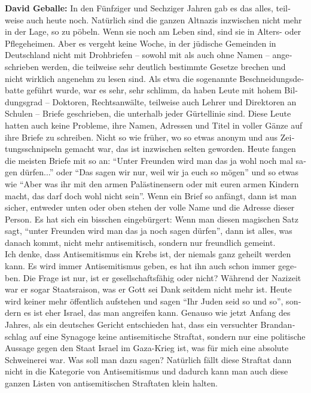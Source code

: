 \begin{otherlanguage}{ngerman}
\textbf{David Geballe:} In den Fünfziger und Sechziger Jahren gab es das alles, teilweise auch heute noch. Natürlich sind die ganzen Altnazis inzwischen nicht mehr in der Lage, so zu pöbeln. Wenn sie noch am Leben sind, sind sie in Alters- oder Pflegeheimen. Aber es vergeht keine Woche, in der jüdische Gemeinden in Deutschland nicht mit Drohbriefen – sowohl mit als auch ohne Namen – angeschrieben werden, die teilweise sehr deutlich bestimmte Gesetze brechen und nicht wirklich angenehm zu lesen sind. Als etwa die sogenannte Beschneidungsdebatte geführt wurde, war es sehr, sehr schlimm, da haben Leute mit hohem Bildungsgrad – Doktoren, Rechtsanwälte, teilweise auch Lehrer und Direktoren an Schulen – Briefe geschrieben, die unterhalb jeder Gürtellinie sind. Diese Leute hatten auch keine Probleme, ihre Namen, Adressen und Titel in voller Gänze auf ihre Briefe zu schreiben. Nicht so wie früher, wo so etwas anonym und aus Zeitungsschnipseln gemacht war, das ist inzwischen selten geworden. Heute fangen die meisten Briefe mit so an: "`Unter Freunden wird man das ja wohl noch mal sagen dürfen..."' oder "`Das sagen wir nur, weil wir ja euch so mögen"' und so etwas wie "`Aber was ihr mit den armen Palästinensern oder mit euren armen Kindern macht, das darf doch wohl nicht sein"'. Wenn ein Brief so anfängt, dann ist man sicher, entweder unten oder oben stehen der volle Name und die Adresse dieser Person. Es hat sich ein bisschen eingebürgert: Wenn man diesen magischen Satz sagt, "`unter Freunden wird man das ja noch sagen dürfen"', dann ist alles, was danach kommt, nicht mehr antisemitisch, sondern nur freundlich gemeint.\\ 
Ich denke, dass Antisemitismus ein Krebs ist, der niemals ganz geheilt werden kann. Es wird immer Antisemitismus geben, es hat ihn auch schon immer gegeben. Die Frage ist nur, ist er gesellschaftsfähig oder nicht? Während der Nazizeit war er sogar Staatsraison, was er Gott sei Dank seitdem nicht mehr ist. Heute wird keiner mehr öffentlich aufstehen und sagen "`Ihr Juden seid so und so"', sondern es ist eher Israel, das man angreifen kann. Genauso wie jetzt Anfang des Jahres, als ein deutsches Gericht entschieden hat, dass ein versuchter Brandanschlag auf eine Synagoge keine antisemitische Straftat, sondern nur eine politische Aussage gegen den Staat Israel im Gaza-Krieg ist, was für mich eine absolute Schweinerei war. Was soll man dazu sagen? Natürlich fällt diese Straftat dann nicht in die Kategorie von Antisemitismus und dadurch kann man auch diese ganzen Listen von antisemitischen Straftaten klein halten. 


\end{otherlanguage}
